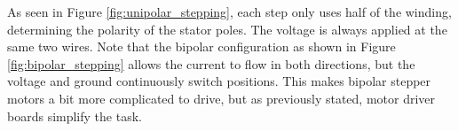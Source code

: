 As seen in Figure \ref{fig:unipolar_stepping}, each step only uses half of the winding, determining the polarity of the stator poles. The voltage is always applied at the same two wires.
\newpage
Note that the bipolar configuration as shown in Figure \ref{fig:bipolar_stepping} allows the current to flow in both directions, but the voltage and ground continuously switch positions. This makes bipolar stepper motors a bit more complicated to drive, but as previously stated, motor driver boards simplify the task.

\begin{figure}[htp] 
    \centering
    \hfill
    \hfill
   	\hfill
\end{figure}
